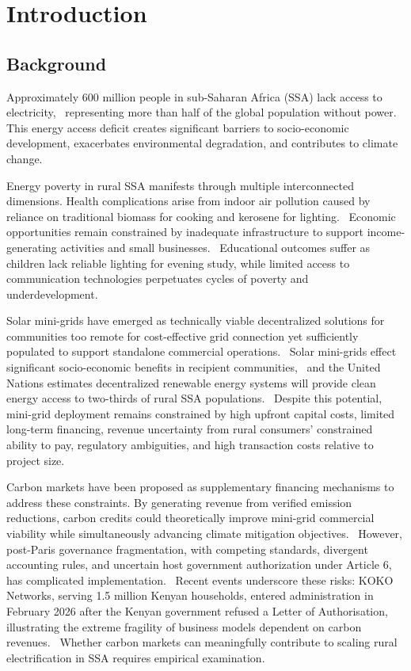 \section{Introduction} 
\label{sec:intro}
\subsection{Background}
\label{subsec:background}
Approximately 600 million people in sub-Saharan Africa (SSA) lack access to electricity,~\cite{iea2023} representing more than half of the global population without power. This energy access deficit creates significant barriers to socio-economic development, exacerbates environmental degradation, and contributes to climate change.~\cite{urban2019,esmap2019}

Energy poverty in rural SSA manifests through multiple interconnected dimensions. Health complications arise from indoor air pollution caused by reliance on traditional biomass for cooking and kerosene for lighting.~\cite{lam2012} Economic opportunities remain constrained by inadequate infrastructure to support income-generating activities and small businesses.~\cite{bos2018} Educational outcomes suffer as children lack reliable lighting for evening study, while limited access to communication technologies perpetuates cycles of poverty and underdevelopment.~\cite{kangawa2008}

Solar mini-grids have emerged as technically viable decentralized solutions for communities too remote for cost-effective grid connection yet sufficiently populated to support standalone commercial operations.~\cite{se4all2015} Solar mini-grids effect significant socio-economic benefits in recipient communities,~\cite{minigrid-impact} and the United Nations estimates decentralized renewable energy systems will provide clean energy access to two-thirds of rural SSA populations.~\cite{irena2018} Despite this potential, mini-grid deployment remains constrained by high upfront capital costs, limited long-term financing, revenue uncertainty from rural consumers' constrained ability to pay, regulatory ambiguities, and high transaction costs relative to project size.~\cite{bhattacharyya2016,trotter2017,esmap2019}

Carbon markets have been proposed as supplementary financing mechanisms to address these constraints. By generating revenue from verified emission reductions, carbon credits could theoretically improve mini-grid commercial viability while simultaneously advancing climate mitigation objectives.~\cite{creutzig2017} However, post-Paris governance fragmentation, with competing standards, divergent accounting rules, and uncertain host government authorization under Article 6, has complicated implementation.~\cite{ahonen-governance} Recent events underscore these risks: KOKO Networks, serving 1.5 million Kenyan households, entered administration in February 2026 after the Kenyan government refused a Letter of Authorisation, illustrating the extreme fragility of business models dependent on carbon revenues.~\cite{koko-disrupt} Whether carbon markets can meaningfully contribute to scaling rural electrification in SSA requires empirical examination.

